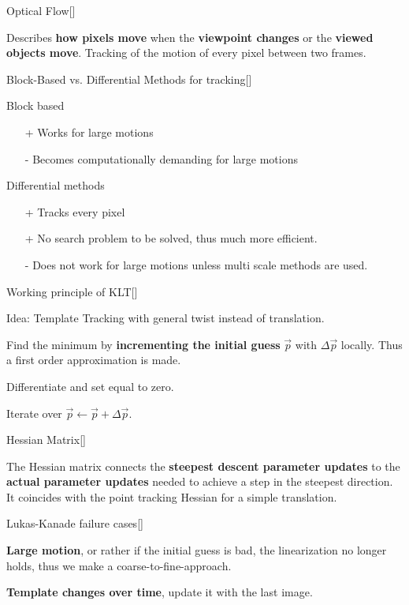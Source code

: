 \documentclass[10pt,a4paper]{scrartcl}
\begin{document}
\begin{multicols*}{2}
\begin{QandA}{Optical Flow}[\Definition]
\item Describes \textbf{how pixels move} when the \textbf{viewpoint changes} or the \textbf{viewed objects move}. Tracking of the motion of every pixel between two frames.
\end{QandA}

\begin{QandA}{Block-Based vs. Differential Methods for tracking}[\Comparison]
\item Block based
\begin{itemize}
\item[+] Works for large motions
\item[-] Becomes computationally demanding for large motions
\end{itemize}
\item Differential methods
\begin{itemize}
\item[+] Tracks every pixel
\item[+] No search problem to be solved, thus much more efficient.
\item[-] Does not work for large motions unless multi scale methods are used.
\end{itemize}
\end{QandA}

\begin{QandA}{Working principle of KLT}[\Derivation]
\item Idea: Template Tracking with general twist instead of translation.
\item Find the minimum by \textbf{incrementing the initial guess} $\vec{p}$ with $\Delta \vec{p}$ locally. Thus a first order approximation is made.
\item Differentiate and set equal to zero.
\item Iterate over $\vec{p}\leftarrow \vec{p}+\Delta\vec{p}$.
\end{QandA}

\begin{QandA}{Hessian Matrix}[\Derivation]
\item The Hessian matrix connects the \textbf{steepest descent parameter updates} to the \textbf{actual parameter updates} needed to achieve a step in the steepest direction. It coincides with the point tracking Hessian for a simple translation.
\end{QandA}

\begin{QandA}{Lukas-Kanade failure cases}[\Application]
\item \textbf{Large motion}, or rather if the initial guess is bad, the linearization no longer holds, thus we make a coarse-to-fine-approach.
\item \textbf{Template changes over time}, update it with the last image.
\end{QandA}


\end{multicols*}
\end{document}
